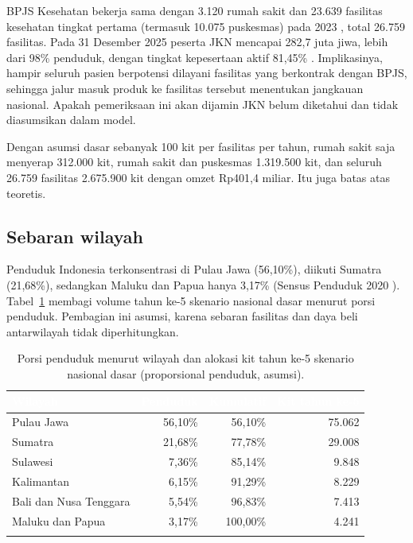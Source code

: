 \documentclass[11pt,a4paper]{article}
\newcommand{\tH}[1]{\textcolor{white}{\sffamily\bfseries\small #1}}
\newcommand{\tabstart}{\small\rowcolors{2}{white}{pale}\arrayrulecolor{rule}}
\newcommand{\hdrrow}{\rowcolor{tealdark}}
\renewcommand{\toprule}{\arrayrulecolor{tealdark}\specialrule{0.9pt}{0pt}{0pt}\arrayrulecolor{rule}}
\renewcommand{\bottomrule}{\arrayrulecolor{tealdark}\specialrule{0.9pt}{0pt}{0pt}\arrayrulecolor{rule}}
\begin{document}
BPJS Kesehatan bekerja sama dengan 3.120 rumah sakit dan 23.639 fasilitas kesehatan tingkat pertama (termasuk 10.075 puskesmas) pada 2023 \cite{bpjs}, total 26.759 fasilitas. Pada 31 Desember 2025 peserta JKN mencapai 282,7 juta jiwa, lebih dari 98\% penduduk, dengan tingkat kepesertaan aktif 81,45\% \cite{jkn}. Implikasinya, hampir seluruh pasien berpotensi dilayani fasilitas yang berkontrak dengan BPJS, sehingga jalur masuk produk ke fasilitas tersebut menentukan jangkauan nasional. Apakah pemeriksaan ini akan dijamin JKN belum diketahui dan tidak diasumsikan dalam model.

Dengan asumsi dasar sebanyak 100 kit per fasilitas per tahun, rumah sakit saja menyerap 312.000 kit, rumah sakit dan puskesmas 1.319.500 kit, dan seluruh 26.759 fasilitas 2.675.900 kit dengan omzet Rp401,4 miliar. Itu juga batas atas teoretis.

\subsection{Sebaran wilayah}

Penduduk Indonesia terkonsentrasi di Pulau Jawa (56,10\%), diikuti Sumatra (21,68\%), sedangkan Maluku dan Papua hanya 3,17\% (Sensus Penduduk 2020 \cite{sensus}). Tabel~\ref{tab:reg} membagi volume tahun ke-5 skenario nasional dasar menurut porsi penduduk. Pembagian ini asumsi, karena sebaran fasilitas dan daya beli antarwilayah tidak diperhitungkan.

\begin{table}[htbp]
\centering
\caption{Porsi penduduk menurut wilayah dan alokasi kit tahun ke-5 skenario nasional dasar (proporsional penduduk, asumsi).}
\label{tab:reg}
\tabstart
\begin{tabular}{@{}lrrr@{}}
\toprule
\hdrrow\tH{Wilayah} & \tH{Penduduk} & \tH{Kumulatif} & \tH{Kit tahun ke-5} \\
\midrule
Pulau Jawa & 56,10\% & 56,10\% & 75.062 \\
Sumatra & 21,68\% & 77,78\% & 29.008 \\
Sulawesi & 7,36\% & 85,14\% & 9.848 \\
Kalimantan & 6,15\% & 91,29\% & 8.229 \\
Bali dan Nusa Tenggara & 5,54\% & 96,83\% & 7.413 \\
Maluku dan Papua & 3,17\% & 100,00\% & 4.241 \\
\bottomrule
\end{tabular}
\end{table}
\end{document}
